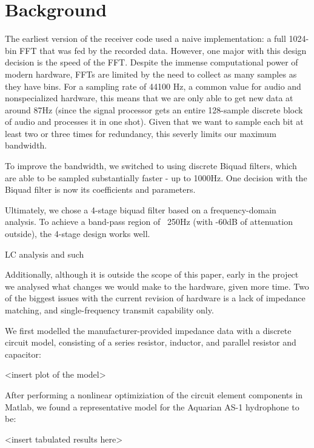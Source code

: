 \chapter{Background}


The earliest version of the receiver code used a naive implementation: a full 1024-bin FFT that was fed by the recorded data. However, one major with this design decision is the speed of the FFT. Despite the immense computational power of modern hardware, FFTs are limited by the need to collect as many samples as they have bins.
For a sampling rate of 44100 Hz, a common value for audio and nonspecialized hardware, this means that we are only able to get new data at around 87Hz (since the signal processor gets an entire 128-sample discrete block of audio and processes it in one shot). Given that we want to sample each bit at least two or three times for redundancy, this severly limits our maximum bandwidth.

To improve the bandwidth, we switched to using discrete Biquad filters, which are able to be sampled substantially faster - up to 1000Hz.
One decision with the Biquad filter is now its coefficients and parameters.

Ultimately, we chose a 4-stage biquad filter based on a frequency-domain analysis. To achieve a band-pass region of ~250Hz (with -60dB of attenuation outside), the 4-stage design works well.


LC analysis and such

Additionally, although it is outside the scope of this paper, early in the project we analysed what changes we would make to the hardware, given more time. Two of the biggest issues with the current revision of hardware is a lack of impedance matching, and single-frequency transmit capability only.

We first modelled the manufacturer-provided impedance data with a discrete circuit model, consisting of a series resistor, inductor, and parallel resistor and capacitor:

<insert plot of the model>

After performing a nonlinear optimiziation of the circuit element components in Matlab, we found a representative model for the Aquarian AS-1 hydrophone to be:

<insert tabulated results here>


